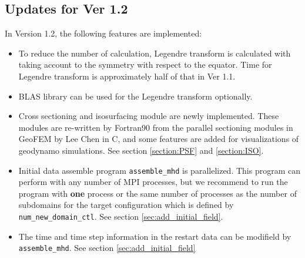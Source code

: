 \subsection{Updates for Ver 1.2}
In Version 1.2, the following features are implemented:
\begin{itemize}
\item To reduce the number of calculation, Legendre transform is calculated with taking account to the symmetry with respect to the equator. Time for Legendre transform is approximately half of that in Ver 1.1.
\item BLAS library can be used for the Legendre transform optionally.
\item Cross sectioning and isosurfacing module are newly implemented. These modules are re-written by Fortran90 from the parallel sectioning modules in GeoFEM by Lee Chen in C, and some features are added for visualizations of geodynamo simulations. See section \ref{section:PSF} and \ref{section:ISO}.
\item Initial data assemble program \verb|assemble_mhd| is parallelized. This program can perform with any number of MPI processes, but we recommend to run the program with {\bf one} process or the same number of processes as the number of subdomains for the target configuration which is defined by \verb|num_new_domain_ctl|. See section \ref{sec:add_initial_field}.
\item The time and time step information in the restart data can be modifield by  \verb|assemble_mhd|. See section \ref{sec:add_initial_field}
\end{itemize}

